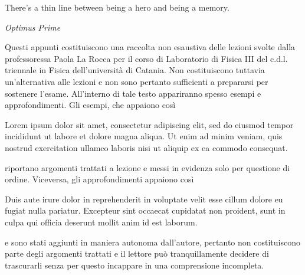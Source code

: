 \documentclass[12pt,openany]{book}
\newcommand{\comment}[1]{}
\begin{document}
\epigraph{There's a thin line between being a hero and being a memory.}{\textit{Optimus Prime}}

Questi appunti costituiscono una raccolta non esaustiva delle lezioni svolte dalla professoressa Paola La Rocca per il corso di Laboratorio di Fisica III del c.d.l. triennale in Fisica dell'università di Catania. Non costituiscono tuttavia un'alternativa alle lezioni e non sono pertanto sufficienti a prepararsi per sostenere l'esame. All'interno di tale testo appariranno spesso esempi e approfondimenti. Gli esempi, che appaiono così

\begin{esempio}
  Lorem ipsum dolor sit amet, consectetur adipiscing elit, sed do eiusmod tempor incididunt ut labore et dolore magna aliqua. Ut enim ad minim veniam, quis nostrud exercitation ullamco laboris nisi ut aliquip ex ea commodo consequat. 
\end{esempio}

riportano argomenti trattati a lezione e messi in evidenza solo per questione di ordine. Viceversa, gli approfondimenti appaiono così

\begin{approfondimento}
  \footnotesize
  Duis aute irure dolor in reprehenderit in voluptate velit esse cillum dolore eu fugiat nulla pariatur. Excepteur sint occaecat cupidatat non proident, sunt in culpa qui officia deserunt mollit anim id est laborum.
\end{approfondimento}

e sono stati aggiunti in maniera autonoma dall'autore, pertanto non costituiscono parte degli argomenti trattati e il lettore può tranquillamente decidere di trascurarli senza per questo incappare in una comprensione incompleta.

\thispagestyle{empty}

\comment{

\part{Tecniche e strumenti di laboratorio}

\chapter{Arduino}

\thispagestyle{empty}

}
\end{document}
